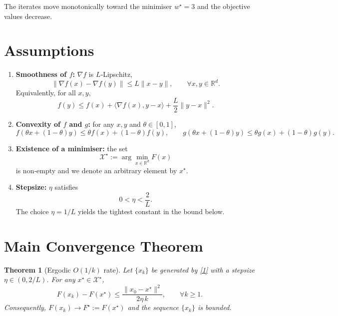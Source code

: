 \documentclass[11pt]{article}
\newtheorem{theorem}{Theorem}
\newcommand{\R}{\mathbb{R}}
\begin{document}
The iterates move monotonically toward the minimiser $w^{\star}=3$ and the objective values decrease.

\newpage
\section*{Assumptions}
\begin{enumerate}
\item \textbf{Smoothness of $f$:} $\nabla f$ is $L$‑Lipschitz,
\[
\|\nabla f(x)-\nabla f(y)\| \le L\|x-y\|,\qquad \forall x,y\in\R^{d}.
\tag{A1}
\]
Equivalently, for all $x,y$,
\[
f(y)\le f(x)+\langle\nabla f(x),y-x\rangle+\frac{L}{2}\|y-x\|^{2}.
\tag{A1'}
\]

\item \textbf{Convexity of $f$ and $g$:} for any $x,y$ and $\theta\in[0,1]$,
\[
f(\theta x+(1-\theta)y)\le \theta f(x)+(1-\theta)f(y),\qquad
g(\theta x+(1-\theta)y)\le \theta g(x)+(1-\theta)g(y).
\tag{A2}
\]

\item \textbf{Existence of a minimiser:} the set 
\[
\mathcal{X}^{\star}:=\arg\min_{x\in\R^{d}}F(x)
\]
is non‑empty and we denote an arbitrary element by $x^{\star}$.

\item \textbf{Stepsize:} $\eta$ satisfies
\[
0<\eta<\frac{2}{L}.
\tag{A3}
\]
The choice $\eta=1/L$ yields the tightest constant in the bound below.
\end{enumerate}

\section*{Main Convergence Theorem}
\begin{theorem}[Ergodic $O(1/k)$ rate]\label{thm:rate}
Let $\{x_{k}\}$ be generated by \eqref{1} with a stepsize $\eta\in(0,2/L)$.  
For any $x^{\star}\in\mathcal{X}^{\star}$,
\[
F(x_{k})-F(x^{\star})\le
\frac{\|x_{0}-x^{\star}\|^{2}}{2\eta\,k},
\qquad\forall k\ge 1.
\tag{3}
\]
Consequently, $F(x_{k})\to F^{\star}:=F(x^{\star})$ and the sequence $\{x_{k}\}$ is bounded.
\end{theorem}
\end{document}
